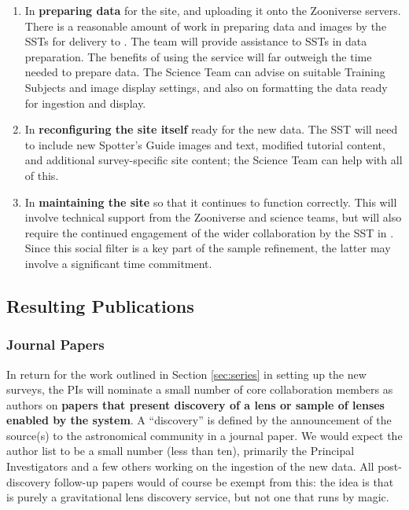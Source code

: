 \documentclass[a4paper]{article}
\begin{document}
\begin{enumerate}

\item In {\bf preparing data} for the site, and uploading it onto the
Zooniverse servers. There is a reasonable amount of work in preparing data and images by the SSTs for delivery to \sw. The \sw team will provide assistance to SSTs in data preparation. The benefits of using the \sw service will far outweigh the time needed to prepare data.  The \sw Science Team can advise on suitable Training
Subjects and image display settings, and also on formatting the data
ready for ingestion and display.

\item In {\bf reconfiguring the site itself} ready for the new data. The
SST will need to include new Spotter's Guide images and text,
modified tutorial content, and additional survey-specific site content;
the \sw Science Team can help with all of this.

\item In {\bf maintaining the site} so that it continues to function
correctly. This will involve technical support from the Zooniverse and \sw science teams,
but will also require the continued engagement of the wider
collaboration by the SST in \Talk. Since this social filter is
a key part of the sample refinement, the latter may involve a
significant time commitment.

\end{enumerate}

\subsection{Resulting Publications}

\subsubsection{Journal Papers}
\label{sec:papers}
In return for the work outlined in Section \ref{sec:series} in setting up the new surveys, the \sw PIs will nominate a
small number of core \sw collaboration members as authors on \textbf{papers that
present discovery of a lens or sample of lenses enabled by the \sw system}. A ``discovery'' is defined by the announcement of the source(s) to the astronomical community in a journal paper. We would expect the \sw author list to be a small number (less than ten), primarily the Principal Investigators and a few others working on the ingestion of the new data. All post-discovery follow-up papers would of course be exempt from this: the idea is that \sw is purely a gravitational lens discovery service, but not one that runs by magic.
\end{document}
